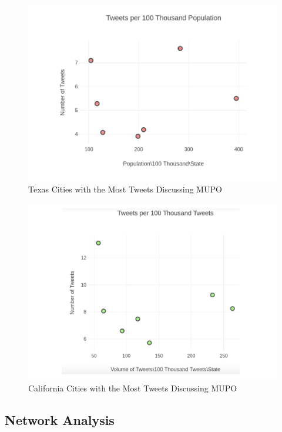 \documentclass[sigconf]{acmart}
\begin{document}
\begin{figure}[!ht]
  \centering\includegraphics[width=\columnwidth]{images/Figure5.pdf}
  \caption{Texas Cities with the Most Tweets Discussing MUPO}
  \label{f:Figure5}
\end{figure}

\begin{figure}[!ht]
  \centering\includegraphics[width=\columnwidth]{images/Figure6.pdf}
  \caption{California Cities with the Most Tweets Discussing MUPO}
  \label{f:Figure6}
\end{figure}
\subsection{Network Analysis} 
\end{document}
